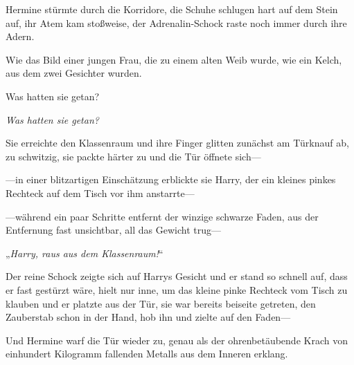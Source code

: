 \later

Hermine stürmte durch die Korridore, die Schuhe schlugen hart auf dem Stein auf, ihr Atem kam stoßweise, der Adrenalin-Schock raste noch immer durch ihre Adern.

Wie das Bild einer jungen Frau, die zu einem alten Weib wurde, wie ein Kelch, aus dem zwei Gesichter wurden.

Was hatten sie getan?

\emph{Was hatten sie getan?}

Sie erreichte den Klassenraum und ihre Finger glitten zunächst am Türknauf ab, zu schwitzig, sie packte härter zu und die Tür öffnete sich—

—in einer blitzartigen Einschätzung erblickte sie Harry, der ein kleines pinkes Rechteck auf dem Tisch vor ihm anstarrte—

—während ein paar Schritte entfernt der winzige schwarze Faden, aus der Entfernung fast unsichtbar, all das Gewicht trug—

„\emph{Harry, raus aus dem Klassenraum!}“

Der reine Schock zeigte sich auf Harrys Gesicht und er stand so schnell auf, dass er fast gestürzt wäre, hielt nur inne, um das kleine pinke Rechteck vom Tisch zu klauben und er platzte aus der Tür, sie war bereits beiseite getreten, den Zauberstab schon in der Hand, hob ihn und zielte auf den Faden—


Und Hermine warf die Tür wieder zu, genau als der ohrenbetäubende Krach von einhundert Kilogramm fallenden Metalls aus dem Inneren erklang.

